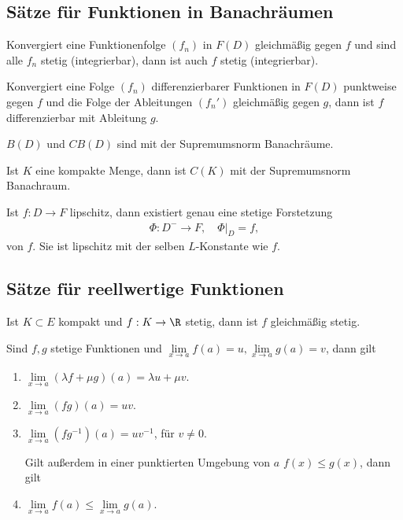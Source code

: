 \subsection{Sätze für Funktionen in Banachräumen}

\begin{prop}
Konvergiert eine Funktionenfolge $(f_n)$ in $F(D)$ gleichmäßig gegen $f$ und
sind alle $f_n$ stetig (integrierbar), dann ist auch $f$ stetig
(integrierbar).
\end{prop}
\begin{prop}
Konvergiert eine Folge $(f_n)$ differenzierbarer Funktionen in $F(D)$ punktweise
gegen $f$ und die Folge der Ableitungen $(f_n')$ gleichmäßig gegen $g$, dann ist
$f$ differenzierbar mit Ableitung $g$.
\end{prop}
\begin{prop}
$B(D)$ und $CB(D)$ sind mit der Supremumsnorm Banachräume.
\end{prop}
\begin{prop}
Ist $K$ eine kompakte Menge, dann ist $C(K)$ mit der Supremumsnorm
Banachraum.
\end{prop}
\begin{prop}
Ist $f: D\to F$ lipschitz, dann existiert genau eine stetige Forstetzung 
\begin{align*}
\Phi: D^- \to F,\quad \Phi|_D = f,
\end{align*}
von $f$. Sie ist lipschitz mit der selben $L$-Konstante wie $f$.
\end{prop}

\subsection{Sätze für reellwertige Funktionen}

\begin{prop}
Ist $K\subset E$ kompakt und $f: K\to \R$ stetig, dann ist $f$ gleichmäßig
stetig.
\end{prop}
\begin{prop}
Sind $f,g$ stetige Funktionen und $\lim \limits_{x\to a} f(a) = u, \lim
\limits_{x\to a} g(a) = v$, dann gilt
\begin{enumerate}
  \item $\lim \limits_{x\to a} (\lambda f + \mu g)(a) = \lambda u + \mu v$.
  \item $\lim \limits_{x\to a} (fg)(a) = uv$.
  \item $\lim \limits_{x\to a} (fg^{-1})(a) = uv^{-1}$, für $v\neq 0$.

  Gilt außerdem in einer punktierten Umgebung von $a$ $f(x) \le g(x)$, dann gilt
  \item $\lim \limits_{x\to a} f(a) \le \lim \limits_{x\to a} g(a)$.
\end{enumerate}
\end{prop}

